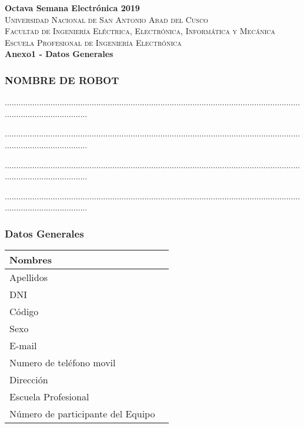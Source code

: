 \documentclass{article}
\begin{document}
\newpage
{\center
{\Huge \bfseries Octava Semana Electrónica 2019} \\ [0.4cm]
\textsc{\LARGE  Universidad Nacional de San Antonio Abad del Cusco}\\[0.4cm] 
\textsc{\Large Facultad de Ingeniería Eléctrica, Electrónica, Informática y Mecánica}\\[0.4cm] 
\textsc{\large Escuela Profesional de Ingeniería Electrónica}\\[0.4cm]
{ \bfseries Anexo1 - Datos Generales}}

\subsubsection{NOMBRE DE ROBOT}

.....................................................................................................................................................................

.....................................................................................................................................................................

.....................................................................................................................................................................

.....................................................................................................................................................................


\subsubsection{Datos Generales}

\begin{tabular}{|p{5cm}|p{10cm}|}
\hline
Nombres & \\ \hline
Apellidos & \\ \hline
DNI & \\ \hline
Código & \\ \hline
Sexo & \\ \hline
E-mail & \\ \hline
Numero de teléfono movil & \\ \hline
Dirección & \\ \hline
Escuela Profesional & \\ \hline
Número de participante del Equipo & \\ \hline
\end{tabular}
\end{document}
